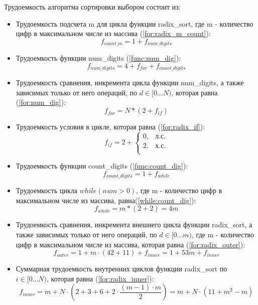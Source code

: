 Трудоемкость алгоритма сортировки выбором состоит из:
\begin{itemize}
    \item Трудоемкость подсчета m для цикла функции radix\_sort, где m - количество цифр в максимальном числе из массива (\ref{for:radix_m_count}):
    \begin{equation}
		\label{for:radix_m_count}
		f_{count\_m} = 1 + f_{num\_digits}
	\end{equation}
	\item Трудоемкость функции num\_digits (\ref{func:num_dig}):
	\begin{equation}
		\label{func:num_dig}
		f_{num\_digits} = 4 + f_{for} + f_{count\_digits}
	\end{equation}
	\item Трудоемкость сравнения, инкремента цикла функции num\_digits, а также зависимых только от него операций, по $d \in [0...N)$, которая равна (\ref{for:num_dig}):
	\begin{equation}
		\label{for:num_dig}
		f_{for} = N * (2 + f_{if})
	\end{equation}
	\item Трудоемкость условия в цикле, которая равна (\ref{for:radix_if}):
	\begin{equation}
		\label{for:radix_if}
		f_{if} = 2 + \begin{cases}
			0, & \text{л.с.}\\
			2, & \text{х.с.}\\
		\end{cases}
	\end{equation}
	\item Трудоемкость функции count\_digits (\ref{func:count_dig}):
	\begin{equation}
		\label{func:count_dig}
		f_{count\_digits} = 1 + f_{while}
	\end{equation}
	\item Трудоемкость цикла $while(num > 0)$, где m - количество цифр в максимальном числе из массива, равна(\ref{while:count_dig}):
	\begin{equation}
		\label{while:count_dig}
		f_{while} = m * (2 + 2) = 4m
	\end{equation}
	\item Трудоемкость сравнения, инкремента внешнего цикла функции radix\_sort, а также зависимых только от него операций, по $d \in [0...m)$, где m - количество цифр в максимальном числе из массива, которая равна (\ref{for:radix_outer}):
	\begin{equation}
		\label{for:radix_outer}
		f_{outer} = 1 + m \cdot (42 + 11) + f_{inner} = 1 + 53m + f_{inner}
	\end{equation}
	\item Суммарная трудоемкость внутренних циклов функции radix\_sort по $i \in [0...N)$, которая равна (\ref{for:radix_inner}):
	\begin{equation}
		\label{for:radix_inner}
		f_{inner} = m + N \cdot (2 + 3 + 6 + 2 \cdot \frac{(m - 1) \cdot m}{2}) = m + N \cdot (11 + m^2 - m)
	\end{equation}
\end{itemize}

